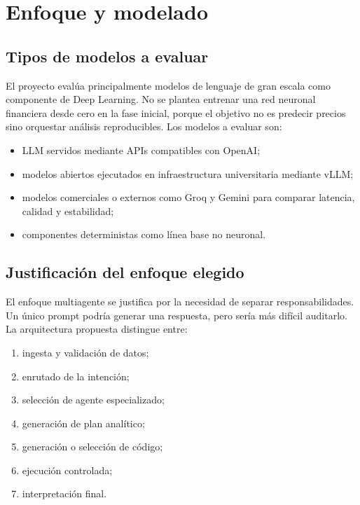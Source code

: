 \documentclass[11pt,a4paper]{article}
\let\oldsection\section
\renewcommand{\section}{\clearpage\oldsection}
\begin{document}
\section{Enfoque y modelado}

\subsection{Tipos de modelos a evaluar}

El proyecto eval\'ua principalmente modelos de lenguaje de gran escala como componente de Deep Learning. No se plantea entrenar una red neuronal financiera desde cero en la fase inicial, porque el objetivo no es predecir precios sino orquestar an\'alisis reproducibles. Los modelos a evaluar son:

\begin{itemize}
    \item LLM servidos mediante APIs compatibles con OpenAI;
    \item modelos abiertos ejecutados en infraestructura universitaria mediante vLLM;
    \item modelos comerciales o externos como Groq y Gemini para comparar latencia, calidad y estabilidad;
    \item componentes deterministas como l\'inea base no neuronal.
\end{itemize}

\subsection{Justificaci\'on del enfoque elegido}

El enfoque multiagente se justifica por la necesidad de separar responsabilidades. Un \'unico prompt podr\'ia generar una respuesta, pero ser\'ia m\'as dif\'icil auditarlo. La arquitectura propuesta distingue entre:

\begin{enumerate}
    \item ingesta y validaci\'on de datos;
    \item enrutado de la intenci\'on;
    \item selecci\'on de agente especializado;
    \item generaci\'on de plan anal\'itico;
    \item generaci\'on o selecci\'on de c\'odigo;
    \item ejecuci\'on controlada;
    \item interpretaci\'on final.
\end{enumerate}
\end{document}
